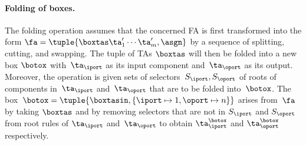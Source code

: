 {%

\paragraph{Folding of boxes.}
The folding operation assumes that the concerned FA is first transformed into the form
$\fa = \tuple{\boxtas \ta_1' \cdots \ta_m',\asgn}$ by a sequence of splitting,
cutting, and swapping.
%
%
The tuple of TAs $\boxtas$ will then be folded into a new box $\botox$
with~$\ta_\iport$ as its input component and~$\ta_\oport$ as its output.
Moreover, the operation is given sets of selectors~$S_{\iport},
S_{\oport}$ of roots of components in~$\ta_\iport$ and~$\ta_\oport$ that are to
be folded into~$\botox$.
%
The box~$\botox =
\tuple{\boxtasin,\{\iport\mapsto 1,\oport\mapsto n\}}$
 arises from~$\fa$ by taking $\boxtas$
%
and by removing selectors that are not in $S_{\iport}$ and $S_{\oport}$
from root rules of $\ta_\iport$ and~$\ta_\oport$ to obtain $\ta_\iport^\botox$ and
$\ta_\oport^\botox$ respectively.
%
%

}
